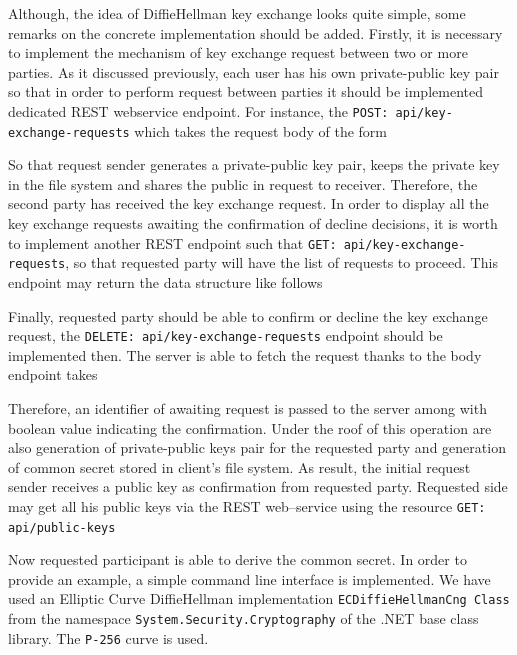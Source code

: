 Although, the idea of Diffie\textendash Hellman key exchange looks quite simple, some remarks on the concrete implementation should be added.
Firstly, it is necessary to implement the mechanism of key exchange request between two or more parties.
As it discussed previously, each user has his own private-public key pair so that in order to perform request between
parties it should be implemented dedicated REST web\textendash service endpoint.
For instance, the \texttt{POST: api/key-exchange-requests} which takes the request body of the form



So that request sender generates a private-public key pair, keeps the private key in the file system
and shares the public in request to receiver.
Therefore, the second party has received the key exchange request.
In order to display all the key exchange requests awaiting the confirmation of decline decisions, it is worth to implement
another REST endpoint such that \texttt{GET: api/key-exchange-requests}, so that requested party will have the list of
requests to proceed.
This endpoint may return the data structure like follows



Finally, requested party should be able to confirm or decline the key exchange request, the
\texttt{DELETE: api/key-exchange-requests} endpoint should be implemented then.
The server is able to fetch the request thanks to the body endpoint takes



Therefore, an identifier of awaiting request is passed to the server among with boolean value
indicating the confirmation.
Under the roof of this operation are also generation of private-public keys pair for the requested party and
generation of common secret stored in client's file system.
As result, the initial request sender receives a public key as confirmation from requested party.
Requested side may get all his public keys via the REST web--service using the resource \texttt{GET: api/public-keys}



Now requested participant is able to derive the common secret.
In order to provide an example, a simple command line interface is implemented.
We have used an Elliptic Curve Diffie\textendash Hellman implementation \texttt{ECDiffieHellmanCng Class} from the namespace
\texttt{System.Security.Cryptography} of the .NET base class library.
The \texttt{P-256} curve is used.

